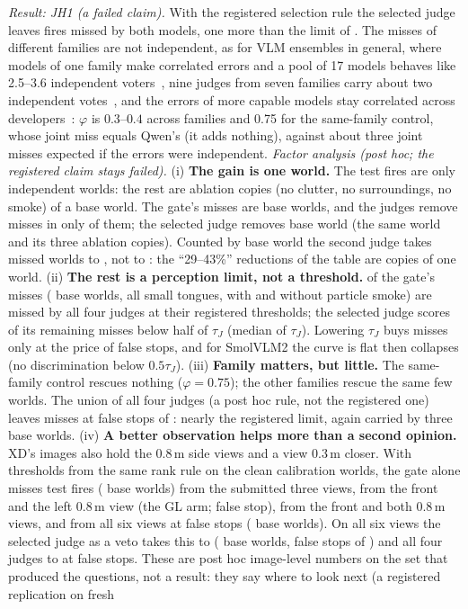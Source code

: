 \documentclass[conference]{IEEEtran}
\begin{document}
\emph{Result: JH1 \JHClaim{} (a failed claim).} With the registered selection rule the selected judge leaves \JHSelJoint{} fires missed by both models, one more than the limit of \JHLimit. The misses of different families are not independent, as for VLM ensembles in general, where models of one family make correlated errors and a pool of 17 models behaves like 2.5--3.6 independent voters~\cite{bugaud2026hiddenclones}, nine judges from seven families carry about two independent votes~\cite{kohli2026ninejudges}, and the errors of more capable models stay correlated across developers~\cite{kim2025correlated}: $\varphi$ is $0.3$--$0.4$ across families and 0.75 for the same-family control, whose joint miss equals Qwen's (it adds nothing), against about three joint misses expected if the errors were independent. \emph{Factor analysis (post hoc; the registered claim stays failed).} (i) \textbf{The gain is one world.} The \JHFire{} test fires are only \JHFBases{} independent worlds: the rest are ablation copies (no clutter, no surroundings, no smoke) of a base world. The gate's \JHMissQ{} misses are \JHFMissBases{} base worlds, and the judges remove misses in only \JHFRescuedBases{} of them; the selected judge removes \JHFInternBases{} base world (the same world and its three ablation copies). Counted by base world the second judge takes \JHFMissBases{} missed worlds to \JHFAfterBases{}, not \JHMissQ{} to \JHInternJoint{}: the ``29--43\%'' reductions of the table are copies of one world. (ii) \textbf{The rest is a perception limit, not a threshold.} \JHFNever{} of the gate's misses (\JHFNeverBases{} base worlds, all small tongues, with and without particle smoke) are missed by all four judges at their registered thresholds; the selected judge scores \JHFBelowHalf{} of its \JHFRemaining{} remaining misses below half of $\tau_J$ (median \JHFMedianRatio{} of $\tau_J$). Lowering $\tau_J$ buys misses only at the price of false stops, and for SmolVLM2 the curve is flat then collapses (no discrimination below $0.5\tau_J$). (iii) \textbf{Family matters, but little.} The same-family control rescues nothing ($\varphi=0.75$); the other families rescue the same few worlds. The union of all four judges (a post hoc rule, not the registered one) leaves \JHFAllMiss{} misses at \JHFAllFS{} false stops of \JHClean{}: nearly the registered limit, again carried by three base worlds. (iv) \textbf{A better observation helps more than a second opinion.} XD's images also hold the 0.8\,m side views and a view 0.3\,m closer. With thresholds from the same rank rule on the clean calibration worlds, the gate alone misses \JVBaseMiss{} test fires (\JVBaseBases{} base worlds) from the submitted three views, \JVGLvMiss{} from the front and the left 0.8\,m view (the GL arm; \JVGLvFS{} false stop), \JVWideMiss{} from the front and both 0.8\,m views, and \JVSixMiss{} from all six views at \JVSixFS{} false stops (\JVSixBases{} base worlds). On all six views the selected judge as a veto takes this to \JVSixInternMiss{} (\JVSixInternBases{} base worlds, \JVSixInternFS{} false stops of \JHClean{}) and all four judges to \JVSixAllMiss{} at \JVSixAllFS{} false stops. These are post hoc image-level numbers on the set that produced the questions, not a result: they say where to look next (a registered replication on fresh 
\end{document}
